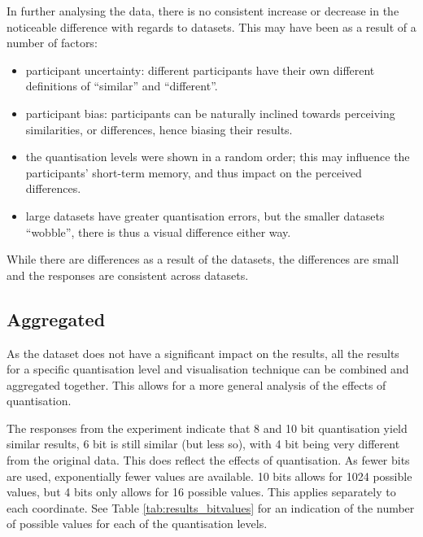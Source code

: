 In further analysing the data, there is no consistent increase or decrease in
the noticeable difference with regards to datasets. This may have been as a
result of a number of factors:
\begin{itemize}

  \item participant uncertainty: different participants have their own
  different definitions of ``similar'' and ``different''.

  \item participant bias: participants can be naturally inclined towards
  perceiving similarities, or differences, hence biasing their results.

  \item the quantisation levels were shown in a random order; this may
  influence the participants' short-term memory, and thus impact on the
  perceived differences.

  \item large datasets have greater quantisation errors, but the smaller
  datasets ``wobble'', there is thus a visual difference either way.

\end{itemize}

While there are differences as a result of the datasets, the differences are
small and the responses are consistent across datasets.


\subsection*{Aggregated}
\label{sub:results_discussion_aggregated}

As the dataset does not have a significant impact on the results, all the
results for a specific quantisation level and visualisation technique can be
combined and aggregated together. This allows for a more general analysis of
the effects of quantisation.

The responses from the experiment indicate that 8 and 10 bit quantisation yield
similar results, 6 bit is still similar (but less so), with 4 bit being very
different from the original data. This does reflect the effects of
quantisation. As fewer bits are used, exponentially fewer values are available.
10 bits allows for 1024 possible values, but 4 bits only allows for 16 possible
values. This applies separately to each coordinate. See Table
\ref{tab:results_bitvalues} for an indication of the number of possible values
for each of the quantisation levels.


